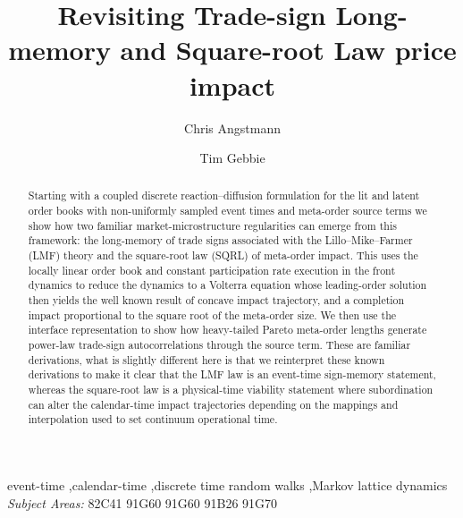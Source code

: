 \documentclass[5p,final]{elsarticle}
\begin{document}
\title{Revisiting Trade-sign Long-memory and Square-root Law price impact}
\author[unsw-mathstats]{Chris Angstmann}
\address[unsw-mathstats]{School of Mathematics and Statistics, University of New South Wales, Sydney, NSW 2052, Australia}
\author[uct-sta]{Tim Gebbie} 
\address[uct-sta]{Department of Statistical Sciences, University of Cape Town, Rondebosch 7701, Western Cape, South Africa}

\begin{abstract}
Starting with a coupled discrete reaction--diffusion formulation for the lit and latent order books with non-uniformly sampled event times and meta-order source terms we show how two familiar market-microstructure regularities can emerge from this framework: the long-memory of trade signs associated with the Lillo--Mike--Farmer (LMF) theory and the square-root law (SQRL) of meta-order impact.  This uses the locally linear order book and constant participation rate execution in the front dynamics to reduce the dynamics to a Volterra equation whose leading-order solution then yields the well known result of concave impact trajectory, and a completion impact proportional to the square root of the meta-order size. We then use the interface representation to show how heavy-tailed Pareto meta-order lengths generate power-law trade-sign autocorrelations through the source term. These are familiar derivations, what is slightly different here is that we reinterpret these known derivations to make it clear that the LMF law is an event-time sign-memory statement, whereas the square-root law is a physical-time viability statement where subordination can alter the calendar-time impact trajectories depending on the mappings and interpolation used to set continuum operational time.
\end{abstract}

\begin{keyword}
event-time \sep calendar-time \sep discrete time random walks \sep Markov lattice dynamics \\
{\it Subject Areas:} 
\MSC 82C41 91G60 91G60 91B26
\JEL 91G70
\end{keyword}

\maketitle
\tableofcontents
\end{document}
